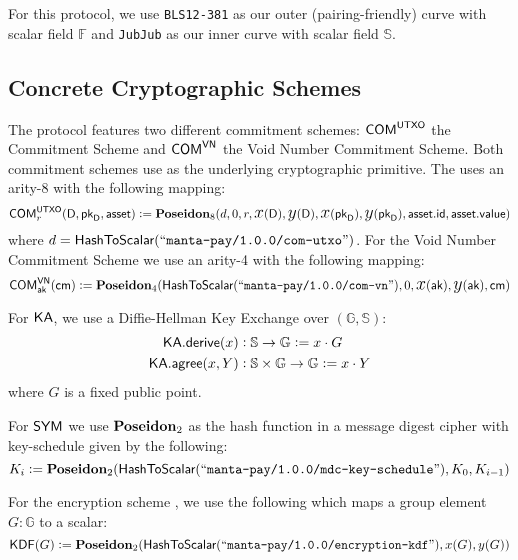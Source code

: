 For this protocol, we use \texttt{BLS12-381} as our outer (pairing-friendly) curve with scalar field $\mathbb{F}$ and \texttt{JubJub} as our inner curve with scalar field $\mathbb{S}$.

\subsection{Concrete Cryptographic Schemes}

\begin{definition}
    The protocol features two different commitment schemes: ${\textsf{COM}}^{{\textsf{UTXO}}}$ the \UTXO{} Commitment Scheme and ${\textsf{COM}}^{{\textsf{VN}}}$ the Void Number Commitment Scheme. Both commitment schemes use \Poseidon{} as the underlying cryptographic primitive. The \UTXO{} uses an arity-8 \Poseidon{} with the following mapping:
    \[{\textsf{COM}}^{{\textsf{UTXO}}}_r(\textsf{D}, {{\textsf{pk}}_\textsf{D}}, {\textsf{asset}}) := {\textbf{Poseidon}}_8(d, 0, r, {\text{\Large $x$}}(\textsf{D}), {\text{\Large $y$}}(\textsf{D}), {\text{\Large $x$}}({{\textsf{pk}}_\textsf{D}}), {\text{\Large $y$}}({{\textsf{pk}}_\textsf{D}}), {\textsf{asset}}.{\textsf{id}}, {\textsf{asset}}.{\textsf{value}})\]
    where $d = {\textsf{HashToScalar}}({``\texttt{manta-pay/1.0.0/com-utxo}"})$.
    For the Void Number Commitment Scheme we use an arity-4 \Poseidon{} with the following mapping:
    \[{\textsf{COM}}^{{\textsf{VN}}}_{\textsf{ak}}({\textsf{cm}}) := {\textbf{Poseidon}}_4({\textsf{HashToScalar}}({``\texttt{manta-pay/1.0.0/com-vn}"}), 0, {\text{\Large $x$}}({\textsf{ak}}), {\text{\Large $y$}}({\textsf{ak}}), {\textsf{cm}})\]
\end{definition}

\begin{definition}
    For ${\textsf{KA}}$, we use a Diffie-Hellman Key Exchange over $(\mathbb{G}, \mathbb{S})$:
    \begin{align*}
        {\textsf{KA}}.{\textsf{derive}}(x)   &: \mathbb{S} \to \mathbb{G}                   := x \cdot G \\
        {\textsf{KA}}.{\textsf{agree}}(x, Y) &: \mathbb{S} \times \mathbb{G} \to \mathbb{G} := x \cdot Y
    \end{align*}
    where $G$ is a fixed public point.
\end{definition}

\begin{definition}
    For ${\textsf{SYM}}$ we use ${\textbf{Poseidon}}_2$ as the hash function in a message digest cipher with key-schedule given by the following:
    \[K_i := {\textbf{Poseidon}}_2({\textsf{HashToScalar}}({``\texttt{manta-pay/1.0.0/mdc-key-schedule}"}), K_0, K_{i-1})\]
\end{definition}

\begin{definition}
    For the encryption scheme , we use the following which maps a group element $G : \mathbb{G}$ to a scalar:
    \[{\textsf{KDF}}(G) := {\textbf{Poseidon}}_2({\textsf{HashToScalar}}({``\texttt{manta-pay/1.0.0/encryption-kdf}"}), x(G), y(G))\]
\end{definition}

